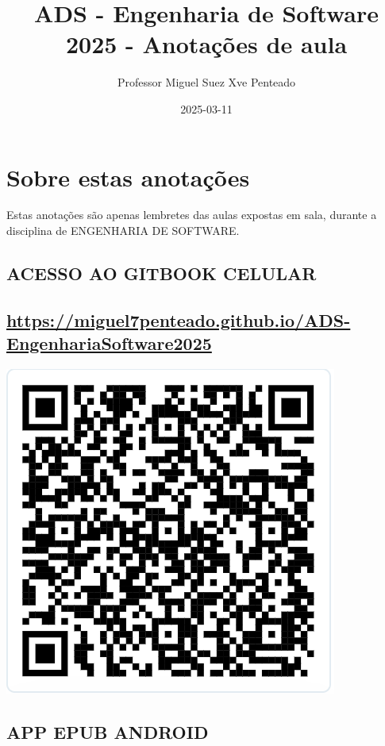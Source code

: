 \documentclass[
]{book}
\title{ADS - Engenharia de Software 2025 - Anotações de aula}
\author{Professor Miguel Suez Xve Penteado}
\date{2025-03-11}
\begin{document}
\maketitle

{
\setcounter{tocdepth}{1}
\tableofcontents
}
\chapter*{Sobre estas anotações}\label{sobre-estas-anotauxe7uxf5es}

Estas anotações são apenas lembretes das aulas expostas em sala, durante a disciplina de ENGENHARIA DE SOFTWARE.

\section{ACESSO AO GITBOOK CELULAR}\label{acesso-ao-gitbook-celular}

\section{\texorpdfstring{\url{https://miguel7penteado.github.io/ADS-EngenhariaSoftware2025}}{https://miguel7penteado.github.io/ADS-EngenhariaSoftware2025}}\label{httpsmiguel7penteado.github.ioads-engenhariasoftware2025}

\includegraphics{images/clipboard-3692082511.png}

\section{APP EPUB ANDROID}\label{app-epub-android}
\end{document}

